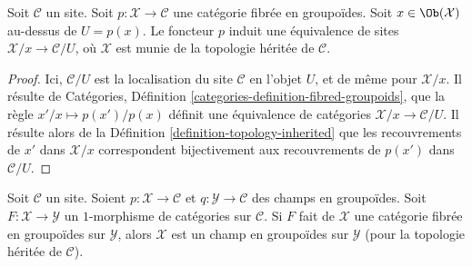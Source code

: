 \begin{lemma}
\label{lemma-localizing}
Soit $\mathcal{C}$ un site. Soit $p : \mathcal{X} \to \mathcal{C}$
une catégorie fibrée en groupoïdes. Soit $x \in \Ob(\mathcal{X})$
au-dessus de $U = p(x)$. Le foncteur $p$ induit une équivalence de sites
$\mathcal{X}/x \to \mathcal{C}/U$, où $\mathcal{X}$ est munie de
la topologie héritée de $\mathcal{C}$.
\end{lemma}

\begin{proof}
Ici, $\mathcal{C}/U$ est la localisation du site
$\mathcal{C}$ en l'objet $U$, et de même pour $\mathcal{X}/x$.
Il résulte de
Catégories, Définition \ref{categories-definition-fibred-groupoids},
que la règle $x'/x \mapsto p(x')/p(x)$ définit une équivalence de
catégories $\mathcal{X}/x \to \mathcal{C}/U$. Il résulte alors de la
Définition \ref{definition-topology-inherited}
que les recouvrements de $x'$ dans $\mathcal{X}/x$ correspondent bijectivement
aux recouvrements de $p(x')$ dans $\mathcal{C}/U$.
\end{proof}

\begin{lemma}
\label{lemma-stack-in-groupoids-over-stack-in-groupoids}
Soit $\mathcal{C}$ un site. Soient $p : \mathcal{X} \to \mathcal{C}$
et $q : \mathcal{Y} \to \mathcal{C}$
des champs en groupoïdes. Soit $F : \mathcal{X} \to \mathcal{Y}$
un $1$-morphisme de catégories sur $\mathcal{C}$. Si $F$ fait de
$\mathcal{X}$ une catégorie fibrée en groupoïdes sur $\mathcal{Y}$,
alors $\mathcal{X}$ est un champ en groupoïdes sur $\mathcal{Y}$ (pour la
topologie héritée de $\mathcal{C}$).
\end{lemma}

